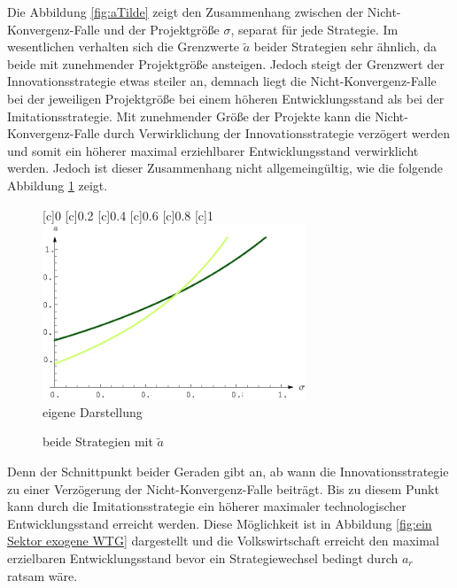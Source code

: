 Die Abbildung \ref{fig:aTilde} zeigt den Zusammenhang zwischen der Nicht-Konvergenz-Falle und der Projektgrö{\ss}e $\sigma$, separat für jede Strategie. Im wesentlichen verhalten sich die Grenzwerte $\tilde{a}$ beider Strategien sehr ähnlich, da beide mit zunehmender Projektgrö{\ss}e ansteigen. Jedoch steigt der Grenzwert der \textcolor[rgb]{0.74,0.97,0.22}{Innovationsstrategie} etwas steiler an, demnach liegt die Nicht-Konvergenz-Falle bei der jeweiligen Projektgrö{\ss}e bei einem höheren Entwicklungsstand als bei der \textcolor[rgb]{0,0.32,0}{Imitationsstrategie}. Mit zunehmender Grö{\ss}e der Projekte kann die Nicht-Konvergenz-Falle durch Verwirklichung der \textcolor[rgb]{0.74,0.97,0.22}{Innovationsstrategie} verzögert werden und somit ein höherer maximal erziehlbarer Entwicklungsstand verwirklicht werden. Jedoch ist dieser Zusammenhang nicht allgemeingültig, wie die folgende Abbildung \ref{fig:beide Strategien mitaTilde} zeigt. \\


	\begin{figure}[htbp]
		\vspace{0.13cm}
		\centering
		\psfrag{\sigma}{$\sigma$}
		[c]{\scriptsize{0}}
		[c]{\scriptsize{0.2}}
		[c]{\scriptsize{0.4}}
		[c]{\scriptsize{0.6}}
		[c]{\scriptsize{0.8}}
		[c]{\scriptsize{1}}
		\includegraphics[width=0.7\textwidth]{images/Abbildungen/beideATildeInEinerAbbEx.eps}\\
		\hfill\footnotesize{}  eigene Darstellung
		\caption{beide Strategien mit $\widetilde{a}$}
		\label{fig:beide Strategien mitaTilde}
	\end{figure}


Denn der Schnittpunkt beider Geraden gibt an, ab wann die \textcolor[rgb]{0.74,0.97,0.22}{Innovationsstrategie} zu einer Verzögerung der Nicht-Konvergenz-Falle beiträgt. Bis zu diesem Punkt kann durch die \textcolor[rgb]{0,0.32,0}{Imitationsstrategie} ein höherer maximaler technologischer Entwicklungsstand erreicht werden. Diese Möglichkeit ist in Abbildung \ref{fig:ein Sektor exogene WTG} dargestellt und die Volkswirtschaft erreicht den maximal erzielbaren Entwicklungsstand bevor ein Strategiewechsel bedingt durch $a_r$ ratsam wäre.\\


